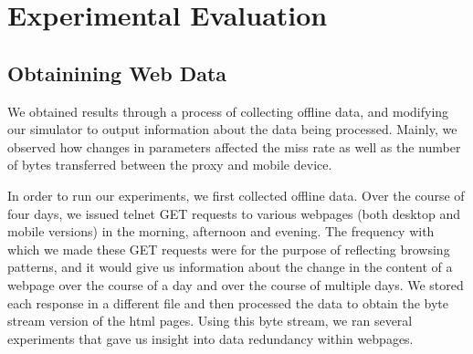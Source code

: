 \section{Experimental Evaluation}
\label{sec:eval}

\subsection{Obtainining Web Data}
We obtained results through a process of collecting offline data, and modifying our simulator to output information about the data being processed. 
Mainly, we observed how changes in parameters affected the miss rate as well as the number of bytes transferred between the proxy and mobile device.

In order to run our experiments, we first collected offline data. 
Over the course of four days, we issued telnet GET requests to various webpages (both desktop and mobile versions) in the morning, afternoon and evening. 
The frequency with which we made these GET requests were for the purpose of reflecting browsing patterns, and it would give us information about the change in the content of a webpage over the course of a day and over the course of multiple days. 
We stored each response in a different file and then processed the data to obtain the byte stream version of the html pages. 
Using this byte stream, we ran several experiments that gave us insight into data redundancy within webpages.

